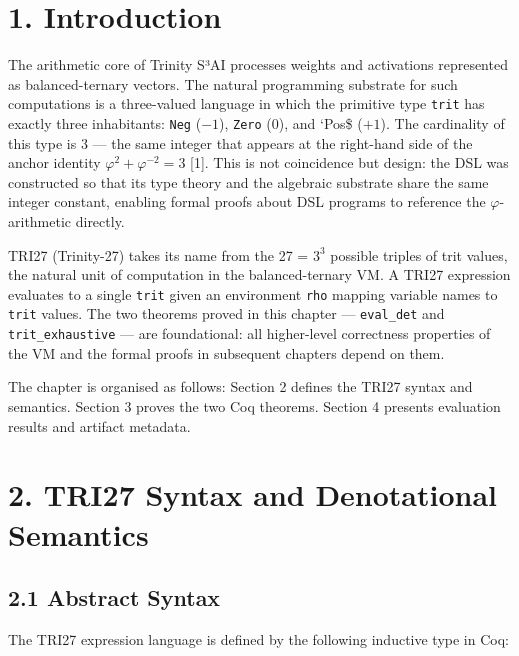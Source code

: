 \section{1. Introduction}\label{fa_27:introduction}

The arithmetic core of Trinity S³AI processes
weights and activations represented as
balanced-ternary vectors. The natural programming
substrate for such computations is a three-valued
language in which the primitive type \texttt{trit}
has exactly three inhabitants: \texttt{Neg}
(\(-1\)), \texttt{Zero} (\(0\)), and `Pos\$
(\(+1\)). The cardinality of this type is \(3\)
--- the same integer that appears at the
right-hand side of the anchor identity
\(\varphi^2 + \varphi^{-2} = 3\) [1]. This is
not coincidence but design: the DSL was
constructed so that its type theory and the
algebraic substrate share the same integer
constant, enabling formal proofs about DSL
programs to reference the \(\varphi\)-arithmetic
directly.

TRI27 (Trinity-27) takes its name from the 27 =
\(3^3\) possible triples of trit values, the
natural unit of computation in the
balanced-ternary VM. A TRI27 expression evaluates
to a single \texttt{trit} given an environment
\texttt{rho} mapping variable names to
\texttt{trit} values. The two theorems proved in
this chapter --- \texttt{eval\_det} and
\texttt{trit\_exhaustive} --- are foundational:
all higher-level correctness properties of the VM
and the formal proofs in subsequent chapters
depend on them.

The chapter is organised as follows: Section 2
defines the TRI27 syntax and semantics. Section 3
proves the two Coq theorems. Section 4 presents
evaluation results and artifact metadata.

\section{2. TRI27 Syntax and Denotational
Semantics}\label{fa_27:tri27-syntax-and-denotational-semantics}

\subsection{2.1 Abstract
Syntax}\label{fa_27:abstract-syntax}

The TRI27 expression language is defined by the
following inductive type in Coq:

\begin{Shaded}
\begin{Highlighting}[]
\end{Highlighting}
\end{Shaded}

